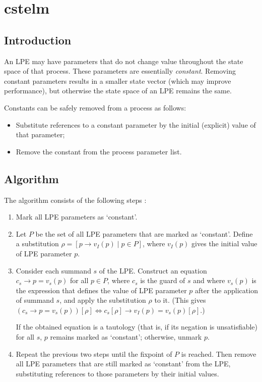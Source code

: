 \chapter{cstelm}

\section{Introduction}

An LPE may have parameters that do not change value throughout the state space of that process.
These parameters are essentially \emph{constant}.
Removing constant parameters results in a smaller state vector (which may improve performance), but otherwise the state space of an LPE remains the same.

Constants can be safely removed from a process as follows:
\begin{itemize}
\item Substitute references to a constant parameter by the initial (explicit) value of that parameter;
\item Remove the constant from the process parameter list.
\end{itemize}

\section{Algorithm}

The algorithm consists of the following steps \cite{groote2001computer}:

\begin{enumerate}

\item Mark all LPE parameters as `constant'.

\item Let $P$ be the set of all LPE parameters that are marked as `constant'.
Define a substitution $\rho = [p \rightarrow v_I(p) \;|\; p \in P]$, where $v_I(p)$ gives the initial value of LPE parameter $p$.

\item Consider each summand $s$ of the LPE.
Construct an equation $c_s \rightarrow p = v_s(p)$ for all $p \in P$, where $c_s$ is the guard of $s$ and where $v_s(p)$ is the expression that defines the value of LPE parameter $p$ after the application of summand $s$, and apply the substitution $\rho$ to it.
(This gives $(c_s \rightarrow p = v_s(p))[\rho] \Leftrightarrow {c_s}[\rho] \rightarrow v_I(p) = v_s(p)[\rho]$.)

If the obtained equation is a tautology (that is, if its negation is unsatisfiable) for all $s$, $p$ remains marked as `constant'; otherwise, unmark $p$.

\item Repeat the previous two steps until the fixpoint of $P$ is reached.
Then remove all LPE parameters that are still marked as `constant' from the LPE, substituting references to those parameters by their initial values.

\end{enumerate}

